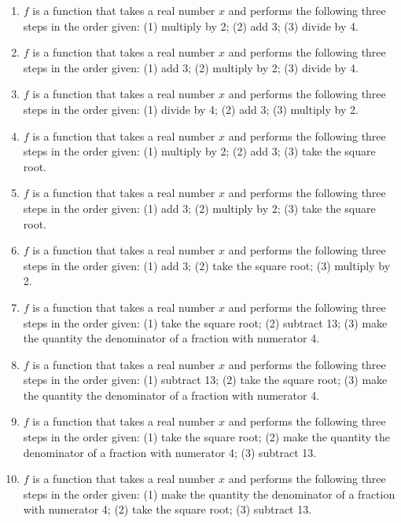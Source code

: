\begin{enumerate}

\item $f$ is a function that takes a real number $x$ and performs the following three steps in the order given: (1) multiply by 2; (2) add 3; (3) divide by 4. \label{buildfunctionfirst}

\item $f$ is a function that takes a real number $x$ and performs the following three steps in the order given: (1) add 3; (2) multiply by 2; (3) divide by 4. 

\item $f$ is a function that takes a real number $x$ and performs the following three steps in the order given: (1) divide by 4; (2) add 3; (3) multiply by 2.

\item $f$ is a function that takes a real number $x$ and performs the following three steps in the order given: (1) multiply by 2; (2) add 3; (3) take the square root.

\item $f$ is a function that takes a real number $x$ and performs the following three steps in the order given: (1) add 3; (2) multiply by 2; (3) take the square root.

\item $f$ is a function that takes a real number $x$ and performs the following three steps in the order given: (1) add 3; (2) take the square root; (3) multiply by 2.
\item $f$ is a function that takes a real number $x$ and performs the following three steps in the order given: (1) take the square root; (2) subtract 13; (3) make the quantity the denominator of a fraction with numerator 4. 

\item  $f$ is a function that takes a real number $x$ and performs the following three steps in the order given: (1) subtract 13; (2) take the square root; (3) make the quantity the denominator of a fraction with numerator 4.  

\item  $f$ is a function that takes a real number $x$ and performs the following three steps in the order given: (1) take the square root; (2) make the quantity the denominator of a fraction with numerator 4; (3) subtract 13. 

\item  $f$ is a function that takes a real number $x$ and performs the following three steps in the order given: (1) make the quantity the denominator of a fraction with numerator 4; (2) take the square root; (3) subtract 13. \label{buildfunctionlast}

\setcounter{HW}{\value{enumi}}
\end{enumerate}

